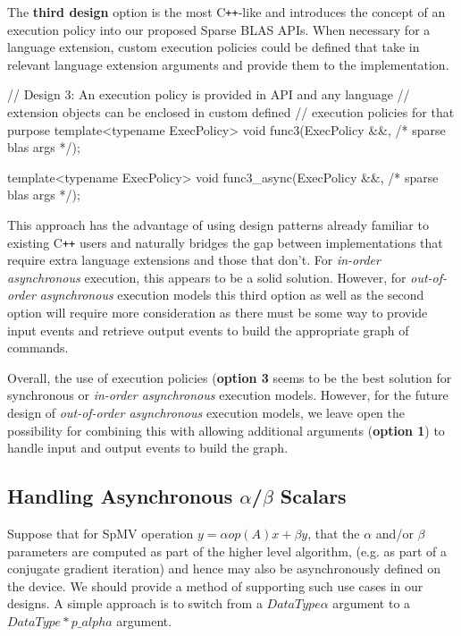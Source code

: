 \documentclass{article}
\newcommand{\cplusplus}{C\texttt{++}\xspace}
\begin{document}
The \textbf{third design} option is the most \cplusplus-like
and introduces the concept of an execution policy into our proposed Sparse BLAS APIs.  When necessary for a language extension, custom execution policies could be defined that take in relevant language extension arguments and provide them to the implementation.
\begin{lstlistings}
// Design 3: An execution policy is provided in API and any language 
//           extension objects can be enclosed in custom defined 
//           execution policies for that purpose
template<typename ExecPolicy>
void func3(ExecPolicy &&, /* sparse blas args */);

template<typename ExecPolicy>
void func3_async(ExecPolicy &&, /* sparse blas args */);
\end{lstlistings}
This approach has the advantage of using design patterns already
familiar to existing \cplusplus users and naturally bridges the gap
between implementations that require extra language extensions and those that don't.  For \textit{in-order asynchronous} execution, this appears to be a solid solution.  However, for \textit{out-of-order asynchronous} execution models this third option as well as the second option will require more consideration as there must be some way to provide input events and retrieve output events to build the appropriate graph of commands.




Overall, the use of execution policies (\textbf{option 3} seems to be the best solution for synchronous or \textit{in-order asynchronous} execution models.  However, for the future design of \textit{out-of-order asynchronous} execution models, we leave open the possibility for combining this with allowing additional arguments (\textbf{option 1}) to handle input and output events to build the graph.


\subsection{Handling Asynchronous $\alpha$/$\beta$ Scalars}

Suppose that for SpMV operation $y=\alpha op(A)x + \beta y$, that the $\alpha$ and/or $\beta$ parameters are computed as part of the higher level algorithm, (e.g. as part of a conjugate gradient iteration) and hence may also be asynchronously defined on the device.  We should provide a method of supporting such use cases in our designs.  A simple approach is to switch from a $DataType \alpha$ argument to a $DataType * p\_alpha$ argument.  
\end{document}
